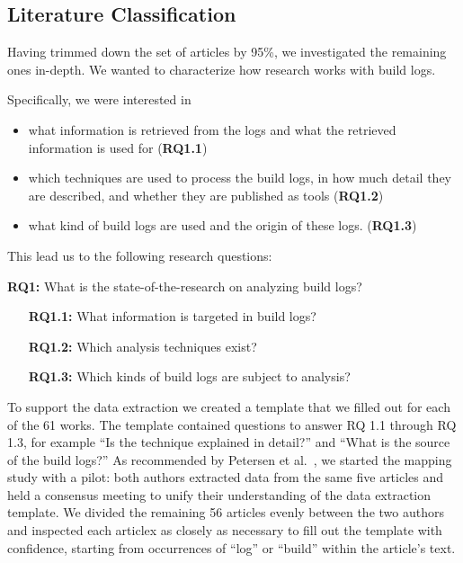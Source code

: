 \subsection{Literature Classification}
Having trimmed down the set of articles by 95\%, we investigated the
remaining ones in-depth.
We wanted to characterize how research works with build logs.

Specifically, we were interested in
\begin{itemize}
  \item what information is retrieved from the logs and
  what the retrieved information is used for (\textbf{RQ1.1})
  \item which techniques are used to process the build logs,
  in how much detail they are described, and whether they are published
  as tools (\textbf{RQ1.2})
  \item what kind of build logs are used and the origin of these
  logs.
(\textbf{RQ1.3})
\end{itemize}

This lead us to the following research questions:
\begin{simplebox}[attach boxed title to top center={yshift=-6mm}]
{\textbf{RQ1:} What is the state-of-the-research on analyzing build logs?}
\begin{itemize}[leftmargin=1cm]
  \item[\textbf{RQ1.1:}] What information is targeted in build logs?
  \item[\textbf{RQ1.2:}] Which analysis techniques exist?
  \item[\textbf{RQ1.3:}] Which kinds of build logs are subject to
  analysis?
\end{itemize}
\end{simplebox}

To support the data extraction we created a template that we filled out for each of the 61 works.
The template contained questions to answer RQ 1.1 through RQ 1.3,
for example ``Is the technique explained in detail?'' and
``What is the source of the build logs?''
As recommended by Petersen et
al.~\cite{petersen2015guidelines}, we started the mapping study with a
pilot:
both authors extracted data from the same five articles and held a
consensus meeting to unify their understanding
of the data extraction template.
We divided the remaining 56 articles evenly between the two authors
and inspected each articlex as closely as necessary to fill out the template
with confidence,
starting from occurrences of ``log'' or ``build'' within the article's
text.

